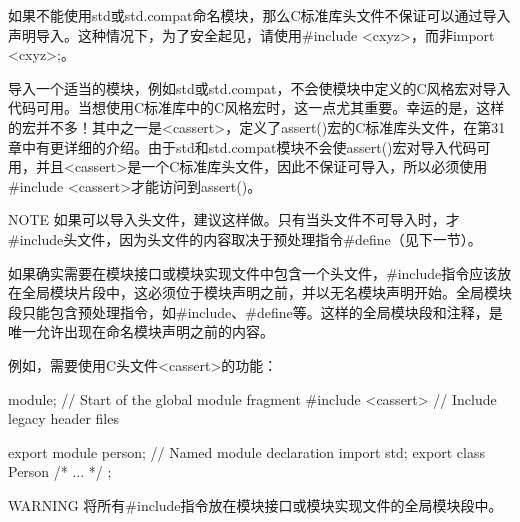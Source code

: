如果不能使用std或std.compat命名模块，那么C标准库头文件不保证可以通过导入声明导入。这种情况下，为了安全起见，请使用\#include <cxyz>，而非import <cxyz>;。

导入一个适当的模块，例如std或std.compat，不会使模块中定义的C风格宏对导入代码可用。当想使用C标准库中的C风格宏时，这一点尤其重要。幸运的是，这样的宏并不多！其中之一是<cassert>，定义了assert()宏的C标准库头文件，在第31章中有更详细的介绍。由于std和std.compat模块不会使assert()宏对导入代码可用，并且<cassert>是一个C标准库头文件，因此不保证可导入，所以必须使用\#include <cassert>才能访问到assert()。

\begin{myNotic}{NOTE}
如果可以导入头文件，建议这样做。只有当头文件不可导入时，才\#include头文件，因为头文件的内容取决于预处理指令\#define（见下一节）。
\end{myNotic}

如果确实需要在模块接口或模块实现文件中包含一个头文件，\#include指令应该放在全局模块片段中，这必须位于模块声明之前，并以无名模块声明开始。全局模块段只能包含预处理指令，如\#include、\#define等。这样的全局模块段和注释，是唯一允许出现在命名模块声明之前的内容。

例如，需要使用C头文件<cassert>的功能：

\begin{cpp}
module; // Start of the global module fragment
#include <cassert> // Include legacy header files

export module person; // Named module declaration
import std;
export class Person { /* ... */ };
\end{cpp}

\begin{myWarning}{WARNING}
将所有\#include指令放在模块接口或模块实现文件的全局模块段中。
\end{myWarning}











